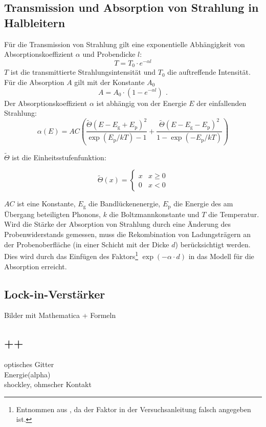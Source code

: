 \subsection{Transmission und Absorption von Strahlung in Halbleitern}
Für die Transmission von Strahlung gilt eine exponentielle Abhängigkeit von Absorptionskoeffizient
$\alpha$ und Probendicke $l$:
\begin{equation}
\label{}
T = T_0 \cdot e^{-\alpha l}
\end{equation}
$T$ ist die transmittierte Strahlungsintensität und $T_0$ die auftreffende Intensität.
Für die Absorption $A$ gilt mit der Konstante $A_0$
\begin{equation}
\label{}
A = A_0 \cdot (1 - e^{-\alpha l}) \ \, .
\end{equation}
Der Absorptionskoeffizient $\alpha$ ist abhängig von der Energie $E$ der einfallenden Strahlung:
\begin{equation}
\label{}
\alpha(E) = AC \left(
\frac{\tilde{\Theta}(E-E_{\text{g}}+E_{\text{p}})^2}{\exp (E_{\text{p}}/kT)-1}+
\frac{\tilde{\Theta}(E-E_{\text{g}}-E_{\text{p}})^2}{1-\exp (-E_{\text{p}}/kT)}
\right)
\end{equation}

$\tilde{\Theta}$ ist die Einheitsstufenfunktion:

\begin{equation}
\label{}
\tilde{\Theta}(x)=
\begin{cases}
x & x \geq 0 \\
0 & x < 0
\end{cases}
\end{equation}

$AC$ ist eine Konstante,
$E_{\text{g}}$ die Bandlückenenergie, $E_{\text{p}}$ die Energie des am Übergang beteiligten Phonons,
$k$ die Boltzmannkonstante und $T$ die Temperatur.\\
Wird die Stärke der Absorption von Strahlung durch eine Änderung des Probenwiderstands gemessen,
muss die Rekombination von Ladungsträgern an der Probenoberfläche
(in einer Schicht mit der Dicke $d$) berücksichtigt werden.
Dies wird durch das Einfügen des
Faktors\footnote{Entnommen aus \cite{staatsex}, da der Faktor in der Versuchsanleitung falsch angegeben ist.}
$\exp(-\alpha \cdot d)$ in das Modell für die Absorption erreicht.

\subsection{Lock-in-Verstärker}


Bilder mit Mathematica + Formeln

\subsection{++}
optisches Gitter\\
Energie(alpha)\\
shockley, ohmscher Kontakt
